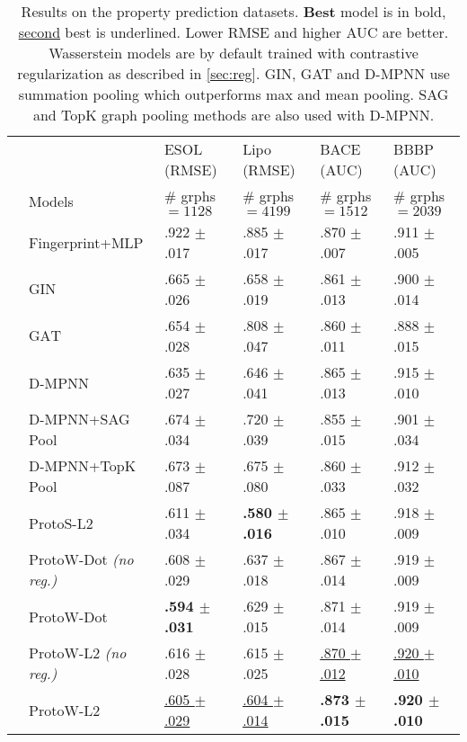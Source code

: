 \documentclass[letterpaper]{article} \usepackage{aaai22}  \usepackage{times}  \usepackage{helvet}  \usepackage{courier}  \usepackage[hyphens]{url}  \usepackage{graphicx} \urlstyle{rm} \def\UrlFont{\rm}  \usepackage{natbib}  \usepackage{caption} \DeclareCaptionStyle{ruled}{labelfont=normalfont,labelsep=colon,strut=off} \frenchspacing  \setlength{\pdfpagewidth}{8.5in}  \setlength{\pdfpageheight}{11in}  \usepackage{algorithm}
\begin{document}
\begin{table*}
\begin{center}
  \begin{tabular}{c|p{3.2cm}|p{2.18cm}|p{2.08cm}|p{2.08cm}|p{2.08cm} }
 & & ESOL (RMSE)  & Lipo (RMSE)  & BACE (AUC)  & BBBP (AUC) \\
& Models \ & \# grphs $=1128$ & \# grphs$=4199$ & \# grphs$=1512$ & \# grphs$=2039$ \\  
 \hline \hline
\parbox[t]{2mm}{} & Fingerprint+MLP \qquad & .922 $\pm$ .017& .885 $\pm$ .017 & .870 $\pm$ .007 & .911 $\pm$ .005 \\ 
& $\mathrm{GIN}$ \qquad & .665 $\pm$ .026 & .658 $\pm$ .019 & .861 $\pm$ .013 & .900 $\pm$ .014 \\ 
& $\mathrm{GAT}$ \qquad & .654 $\pm$ .028 & .808 $\pm$ .047 & .860 $\pm$ .011 & .888 $\pm$ .015 \\ 
& D-MPNN \qquad & .635 $\pm$ .027& .646 $\pm$ .041 & .865 $\pm$ .013 & .915 $\pm$ .010 \\ 
& D-MPNN+SAG Pool \qquad & .674 $\pm$ .034 & .720 $\pm$ .039 & .855 $\pm$ .015 & .901 $\pm$ .034 \\
& D-MPNN+TopK Pool \qquad & .673 $\pm$ .087 & .675 $\pm$ .080 & .860 $\pm$ .033 & .912 $\pm$ .032 \\
 \hline \hline
\parbox[t]{2mm}{} & $\mathrm{ProtoS\text{-}L2}$\qquad\ \ \ \ \ \ \  & .611 $\pm$ .034 & \textbf{.580 $\pm$ .016}& .865 $\pm$ .010 & .918 $\pm$ .009 \\ 
& $\mathrm{ProtoW\text{-}Dot}$ \textit{(no reg.)} & .608 $\pm$ .029 & .637 $\pm$ .018 & .867 $\pm$ .014 & .919 $\pm$ .009 \\
& $\mathrm{ProtoW\text{-}Dot}$\quad\ \ \ \ \ \,   & \textbf{.594 $\pm$ .031} & .629 $\pm$ .015 & .871 $\pm$ .014 & .919 $\pm$ .009 \\
 
& $\mathrm{ProtoW\text{-}L2}$ \textit{(no reg.)}\ \ & .616 $\pm$ .028 & .615 $\pm$ .025 & \underline{.870 $\pm$ .012} & \underline{.920 $\pm$ .010} \\
& $\mathrm{ProtoW\text{-}L2}$\qquad\quad \ \ \ \ \ & \underline{.605 $\pm$ .029} & \underline{.604 $\pm$ .014} & \textbf{.873 $\pm$ .015} & \textbf{.920 $\pm$ .010} \\
  \end{tabular}
 
\caption{Results on the property prediction datasets. \textbf{Best} model is in bold, \underline{second} best is underlined. Lower RMSE and higher AUC are better. Wasserstein models are by default trained with contrastive regularization as described in \cref{sec:reg}. GIN, GAT and D-MPNN use summation pooling which outperforms max and mean pooling. SAG and TopK graph pooling methods are also used with D-MPNN. }
\label{tab:1}
\end{center}
\end{table*}
\end{document}
